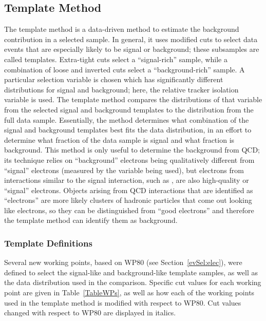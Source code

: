 \subsection{Template Method}
\label{anMeth:BGSubTemplate}
The template method is a data-driven method 
to estimate the background contribution 
in a selected sample.  
In general, it uses modified cuts 
to select data events that are especially 
likely to be signal or background; 
these subsamples are called templates.  
Extra-tight cuts select a ``signal-rich'' sample, 
while a combination of loose and inverted cuts 
select a ``background-rich'' sample.  
A particular selection variable is chosen 
which has significantly different distributions 
for signal and background; 
here, the relative tracker isolation variable is used.  
The template method compares the 
distributions of that variable 
from the selected signal and background templates 
to the distribution from the full data sample. %
Essentially, the method determines what 
combination of the signal and background templates 
best fits the data distribution, 
in an effort to determine what fraction 
of the data sample is signal 
and what fraction is background.  
This method is only useful to determine the 
background from QCD; 
its technique relies on ``background'' electrons 
being qualitatively different from 
``signal'' electrons %
(measured by the variable being used), 
but electrons from interactions similar 
to the signal interaction, 
such as \Wenu, 
are also high-quality or ``signal'' electrons. %
Objects arising from QCD interactions that are 
identified as ``electrons'' are more likely 
clusters of hadronic particles 
that come out looking like electrons, 
so they can be distinguished from 
``good electrons'' and therefore 
the template method can identify 
them as background.  

\subsubsection{Template Definitions}
\label{anMeth:BGSubTemplateDefs}

Several new working points, based on WP80 
(see Section~\ref{evSel:elec}), 
were defined to select 
the signal-like and background-like template samples, 
as well as the data distribution used in the comparison.  
Specific cut values for each working point 
are given in 
Table~\ref{TableWPs}, %
as well as 
how each of the working points used 
in the template method is modified with 
respect to WP80.  
Cut values changed with respect to WP80 
are displayed in italics.  

